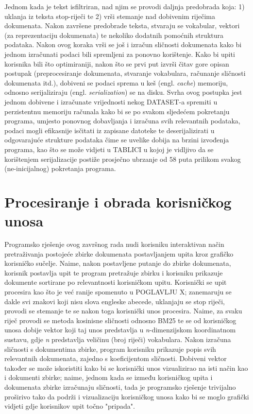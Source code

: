 \documentclass[times, utf8, zavrsni]{fer}
\begin{document}
Jednom kada je tekst isfiltriran, nad njim se provodi daljnja predobrada koja: 1) uklanja iz teksta stop-riječi te 2) vrši stemanje nad dobivenim riječima dokumenata. Nakon završene predobrade teksta, stvaraju se vokabular, vektori (za reprezentaciju dokumenata) te nekoliko dodatnih pomoćnih struktura podataka. Nakon ovog koraka vrši se još i izračun sličnosti dokumenata kako bi jednom izračunati podaci bili spremljeni za ponovno korištenje. Kako bi upiti korisnika bili što optimiraniji, nakon što se prvi put izvrši čitav gore opisan postupak (preprocesiranje dokumenata, stvaranje vokabulara, računanje sličnosti dokumenata itd.), dobiveni se podaci sprema u keš (engl. \textit{cache}) memoriju, odnosno serijaliziraju (engl. \textit{serialization}) se na disku. Svrha ovog postupka jest jednom dobivene i izračunate vrijednosti nekog DATASET-a spremiti u perzistentnu memoriju računala kako bi se po svakom sljedećem pokretanju programa, umjesto ponovnog dobavljanja i izračuna svih relevantnih podataka, podaci mogli efikasnije isčitati iz zapisane datoteke te deserijalizirati u odgovarajuće strukture podataka čime se uvelike dobija na brzini izvođenja programa, kao što se može vidjeti u TABLICI u kojoj je vidljivo da se korištenjem serijalizacije postiže prosječno ubrzanje od 58 puta prilikom svakog (ne-inicijalnog) pokretanja programa.

\section{Procesiranje i obrada korisničkog unosa}
Programsko rješenje ovog završnog rada nudi korisniku interaktivan način pretraživanja postojeće zbirke dokumenata postavljanjem upita kroz grafičko korisničko sučelje. Naime, nakon postavljene putanje do zbirke dokumenata, korisnik postavlja upit te program pretražuje zbirku i korisniku prikazuje dokumente sortirane po relevantnosti korisničkom upitu. Korisnički se upit procesira kao što je već ranije spomenuto u POGLAVLJU X; zanemaruju se dakle svi znakovi koji nisu slova engleske abecede, uklanjaju se stop riječi, provodi se stemanje te se nakon toga korisnički unos procesira. Naime, za svaku riječ provodi se metoda kosinisne sličnosti odnosno BM25 te se od korisničkog unosa dobije vektor koji taj unos predstavlja u \textit{n}-dimenzijskom koordinatnom sustavu, gdje \textit{n} predstavlja veličinu (broj riječi) vokabulara. Nakon izračuna sličnosti s dokumentima zbirke, program korisniku prikazuje popis svih relevantnih dokumenata, zajedno s koeficijentom sličnosti. Dobiveni vektor također se može iskoristiti kako bi se korisnički unos vizualizirao na isti način kao i dokumenti zbirke; naime, jednom kada se između korisničkog upita i dokumenata zbirke izračunaju sličnosti, tada je programsko rješenje trivijalno proširivo tako da podrži i vizualizaciju korisničkog unosa kako bi se moglo grafički vidjeti gdje korisnikov upit točno "pripada".
\end{document}

